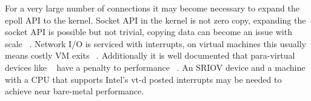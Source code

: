 
 For a very large number of connections it may become necessary to expand the epoll API to the kernel. Socket API in the kernel is not zero copy, expanding the socket API is possible but not trivial, copying data can become an issue with scale ~\cite{Copy}. Network I/O is serviced with interrupts, on virtual machines this usually means costly VM exits ~\cite{Eli, Elvis}. Additionally it is well documented that para-virtual devices like ~\cite{virtio,vmxnet3} have a penalty to performance ~\cite{Eli, Elvis}. An SRIOV device and a machine with a CPU that supports Intel's vt-d posted interrupts may be needed to achieve near bare-metal performance.
